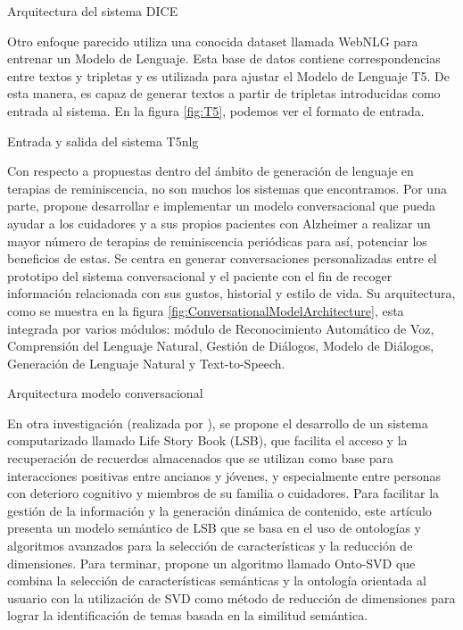 %
{Arquitectura del sistema DICE}

Otro enfoque parecido utiliza una conocida dataset llamada WebNLG para entrenar un Modelo de Lenguaje. Esta base de datos contiene correspondencias entre textos y tripletas y es utilizada para ajustar el Modelo de Lenguaje T5. De esta manera, es capaz de generar textos a partir de tripletas introducidas como entrada al sistema. En la figura \ref{fig:T5}, podemos ver el formato de entrada.

%
{Entrada y salida del sistema T5nlg}

Con respecto a propuestas dentro del ámbito de generación de lenguaje en terapias de reminiscencia, no son muchos los sistemas que encontramos. Por una parte, \cite{deconversational} propone desarrollar e implementar un modelo conversacional que pueda ayudar a los cuidadores y a sus propios pacientes con Alzheimer a realizar un mayor número de terapias de reminiscencia periódicas para así, potenciar los beneficios de estas. Se centra en generar conversaciones personalizadas entre el prototipo del sistema conversacional y el paciente con el fin de recoger información relacionada con sus gustos, historial y estilo de vida. Su arquitectura, como se muestra en la figura \ref{fig:ConversationalModelArchitecture}, esta integrada por varios módulos: módulo de Reconocimiento Automático de Voz, Comprensión del Lenguaje Natural, Gestión de Diálogos, Modelo de Diálogos, Generación de Lenguaje Natural y Text-to-Speech.


%
{Arquitectura modelo conversacional \citep{deconversational}}

En otra investigación (realizada por \cite{shi2012user}), se propone el desarrollo de un sistema computarizado llamado Life Story Book (LSB), que facilita el acceso y la recuperación de recuerdos almacenados que se utilizan como base para interacciones positivas entre ancianos y jóvenes, y especialmente entre personas con deterioro cognitivo y miembros de su familia o cuidadores. Para facilitar la gestión de la información y la generación dinámica de contenido, este artículo presenta un modelo semántico de LSB que se basa en el uso de ontologías y algoritmos avanzados para la selección de características y la reducción de dimensiones. Para terminar, propone un algoritmo llamado Onto-SVD que combina la selección de características semánticas y la ontología orientada al usuario con  la utilización de SVD como método de reducción de dimensiones para lograr la identificación de temas basada en la similitud semántica.

